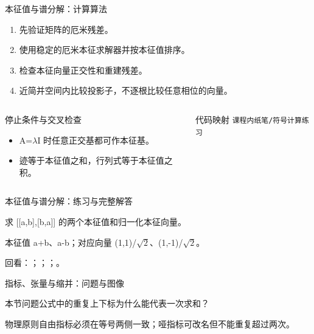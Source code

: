 \begin{frame}[t]{本征值与谱分解：计算算法}
\footnotesize
{}\begin{enumerate}
\item 先验证矩阵的厄米残差。
\item 使用稳定的厄米本征求解器并按本征值排序。
\item 检查本征向量正交性和重建残差。
\item 近简并空间内比较投影子，不逐根比较任意相位的向量。
\end{enumerate}\begin{columns}[T,onlytextwidth]
\begin{block}{停止条件与交叉检查}\scriptsize\begin{itemize}
\item[\CheckMark] A=\ensuremath{\lambda}I 时任意正交基都可作本征基。
\item[\CheckMark] 迹等于本征值之和，行列式等于本征值之积。
\end{itemize}\end{block}
\begin{block}{代码映射}
\scriptsize \texttt{课程内纸笔/\allowbreak{}符号计算练习}
\end{block}\end{columns}\end{frame}

\begin{frame}[t]{本征值与谱分解：练习与完整解答}
\footnotesize
\begin{block}{}求 [[a,b],[b,a]] 的两个本征值和归一化本征向量。\end{block}
\begin{exampleblock}{}本征值 a+b、a-b；对应向量 (1,1)/\allowbreak{}\ensuremath{\sqrt{2}}、(1,-1)/\allowbreak{}\ensuremath{\sqrt{2}}。\end{exampleblock}
\vfill
\scriptsize 回看：；；；。
\end{frame}

\begin{frame}[t]{指标、张量与缩并：问题与图像}
\footnotesize
\begin{block}{本节问题}公式中的重复上下标为什么能代表一次求和？\end{block}
\begin{block}{物理原则}\quad 自由指标必须在等号两侧一致；哑指标可改名但不能重复超过两次。\end{block}
\end{frame}

